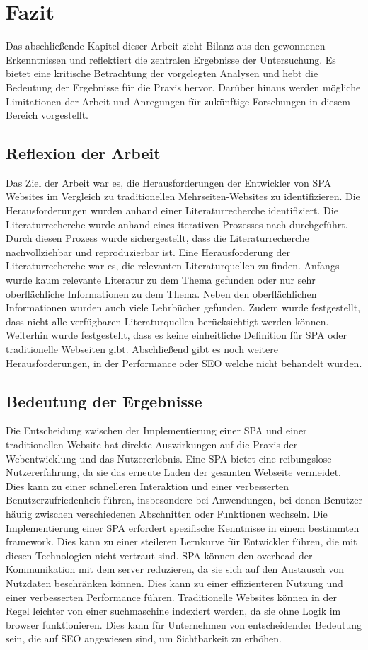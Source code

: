 \section{Fazit}
Das abschließende Kapitel dieser Arbeit zieht Bilanz aus den gewonnenen Erkenntnissen und reflektiert die zentralen Ergebnisse der Untersuchung.
Es bietet eine kritische Betrachtung der vorgelegten Analysen und hebt die Bedeutung der Ergebnisse für die Praxis hervor.
Darüber hinaus werden mögliche Limitationen der Arbeit und Anregungen für zukünftige Forschungen in diesem Bereich vorgestellt.

\subsection{Reflexion der Arbeit}
Das Ziel der Arbeit war es, die Herausforderungen der Entwickler von \ac{SPA} Websites im Vergleich zu traditionellen Mehrseiten-Websites zu identifizieren.
Die Herausforderungen wurden anhand einer Literaturrecherche identifiziert.
Die Literaturrecherche wurde anhand eines iterativen Prozesses nach  durchgeführt.
Durch diesen Prozess wurde sichergestellt, dass die Literaturrecherche nachvollziehbar und reproduzierbar ist.
Eine Herausforderung der Literaturrecherche war es, die relevanten Literaturquellen zu finden.
Anfangs wurde kaum relevante Literatur zu dem Thema gefunden oder nur sehr oberflächliche Informationen zu dem Thema.
Neben den oberflächlichen Informationen wurden auch viele Lehrbücher gefunden.
Zudem wurde festgestellt, dass nicht alle verfügbaren Literaturquellen berücksichtigt werden können.
Weiterhin wurde festgestellt, dass es keine einheitliche Definition für \ac{SPA} oder traditionelle Webseiten gibt.
Abschließend gibt es noch weitere Herausforderungen, in der Performance oder \ac{SEO} welche nicht behandelt wurden.

\subsection{Bedeutung der Ergebnisse}
Die Entscheidung zwischen der Implementierung einer \ac{SPA} und einer traditionellen Website hat direkte Auswirkungen auf die Praxis der Webentwicklung und das Nutzererlebnis.
Eine \ac{SPA} bietet eine reibungslose Nutzererfahrung, da sie das erneute Laden der gesamten Webseite vermeidet.
Dies kann zu einer schnelleren Interaktion und einer verbesserten Benutzerzufriedenheit führen, insbesondere bei Anwendungen, bei denen Benutzer häufig zwischen verschiedenen Abschnitten oder Funktionen wechseln.
Die Implementierung einer \ac{SPA} erfordert spezifische Kenntnisse in einem bestimmten \gls{framework}.
Dies kann zu einer steileren Lernkurve für Entwickler führen, die mit diesen Technologien nicht vertraut sind.
\ac{SPA} können den \gls{overhead} der Kommunikation mit dem \gls{server} reduzieren, da sie sich auf den Austausch von Nutzdaten beschränken können.
Dies kann zu einer effizienteren Nutzung und einer verbesserten Performance führen.
Traditionelle Websites können in der Regel leichter von einer \gls{suchmaschine} indexiert werden, da sie ohne Logik im \gls{browser} funktionieren.
Dies kann für Unternehmen von entscheidender Bedeutung sein, die auf \ac{SEO} angewiesen sind, um Sichtbarkeit zu erhöhen.
